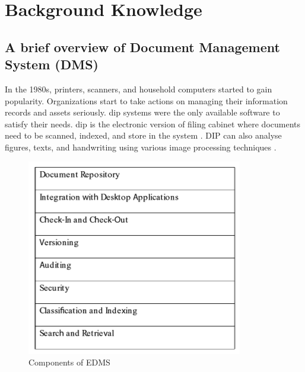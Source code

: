 \chapter{Background Knowledge}

\section{A brief overview of Document Management System (DMS)}
In the 1980s, printers, scanners, and household computers started to gain popularity.
Organizations start to take actions on managing their information records and assets seriously.
\gls{dip} systems were the only available software to satisfy their needs.
\gls{dip} is the electronic version of filing cabinet where documents need to be scanned, indexed, and store in the system \cite{1_adam_2008}.
DIP can also analyse figures, texts, and handwriting using various image processing techniques \cite{akram2010document}.
\begin{figure}
	\includegraphics[scale=0.8]{res/bg-knowledge/edms-components.png}
	\caption{Components of EDMS }
	\label{fig:edms-components}
\end{figure}


